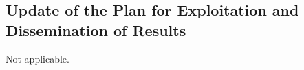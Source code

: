 
\subsection{Update of the Plan for Exploitation and Dissemination of Results}
\label{sec:exploitation-dissemination}

Not applicable. 

